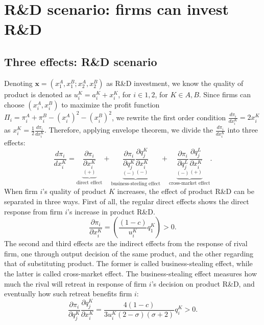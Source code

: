 \documentclass[12pt]{article}
\renewcommand{\vec}[1]{\mathbf{#1}}
\begin{document}
\section{R\&D scenario: firms can invest R\&D} \label{sec:rd}
\subsection{Three effects: R\&D scenario} \label{sec:3_effect}

Denoting $\vec{x}=(x_1^A,x_1^B;x_2^A,x_2^B)$ as R\&D investment, we know the quality of product is denoted as $u_i^K=a_i^K+x_i^K$, for $i \in {1,2}$, for $K \in {A,B}$.
Since firms can choose $(x_i^A, x_i^B)$ to maximize the profit function $\Pi_i=\pi_i^A+\pi_i^B-(x_i^A)^2-(x_i^B)^2$, we rewrite the first order condition $\frac{d \pi_i}{d x_i^K} = 2 x_i^K $ as $x_i^K = \frac{1}{2}  \frac{d \pi_i}{d x_i^K}$.
Therefore, applying envelope theorem, we divide the $\frac{d \pi_i}{d x_i^K}$ into three effects:
\begin{equation}
    \frac{d \pi_i}{d x_i^K} = 
    \underset{\text{direct effect}}{\underbrace{\underset{(+)}{\frac{\partial \pi_i}{\partial x_i^K}}}} + 
    \underset{\text{business-steeling effect}}{\underbrace{\underset{(-)}{\frac{\partial \pi_i}{\partial q_j^K}}  \underset{(-)}{\frac{\partial q_j^K}{\partial x_i^K}}}} +
    \underset{\text{cross-market effect}}{\underbrace{\underset{(-)}{\frac{\partial \pi_i}{\partial q_j^L}}  \underset{(+)}{\frac{\partial q_j^L}{\partial x_i^K}}}}.
\end{equation}
When firm $i$'s quality of product $K$ increases, the effect of product R\&D can be separated in three ways.
First of all, the regular direct effects shows the direct response from firm $i$'s increase in product R\&D. 
\begin{equation}
    \frac{\partial \pi_i}{\partial x_i^K} = \left( \frac{(1 -c)}{u_i^K} q_1^K \right) > 0.
\end{equation}
The second and third effects are the indirect effects from the response of rival firm, one through output decision of the same product, and the other regarding that of substituting product.
The former is called business-stealing effect, while the latter is called cross-market effect.
The business-stealing effect measures how much the rival will retreat in response of firm $i$'s decision on product R\&D, and eventually how such retreat benefits firm $i$:
\begin{equation}
    \frac{\partial \pi_i}{\partial q_j^K}  \frac{\partial q_j^K}{\partial x_i^K} = \frac{4 (1 - c)}{3 u_i^K  (2 - \sigma) (\sigma + 2)} q_i^K > 0.
\end{equation}
\end{document}
